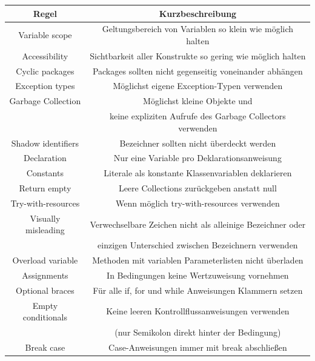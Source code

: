 \documentclass[da,ngerman]{stthesis}
\begin{document}
				\begin{center}
					\tabulinesep=1.5mm
					\begin{longtabu}{|c|c|}
						\hline
  						\textbf{Regel} & \textbf{Kurzbeschreibung}\\
  						\hline
  						Variable scope & Geltungsbereich von Variablen so klein wie möglich halten\\
						\hline
						Accessibility & Sichtbarkeit aller Konstrukte so gering wie möglich halten\\
						\hline
						Cyclic packages & Packages sollten nicht gegenseitig voneinander abhängen \\
						\hline
						Exception types & Möglichst eigene Exception-Typen verwenden \\
						\hline
						Garbage Collection & Möglichst kleine Objekte und \\ & keine expliziten Aufrufe des Garbage Collectors verwenden \\
						\hline
						Shadow identifiers & Bezeichner sollten nicht überdeckt werden \\
						\hline
						Declaration & Nur eine Variable pro Deklarationsanweisung \\
						\hline
						Constants & Literale als konstante Klassenvariablen deklarieren \\
						\hline
						Return empty & Leere Collections zurückgeben anstatt null \\
						\hline
						Try-with-resources & Wenn möglich try-with-resources verwenden \\
						\hline
						Visually misleading & Verwechselbare Zeichen nicht als alleinige Bezeichner oder \\ & einzigen Unterschied zwischen Bezeichnern verwenden \\
						\hline
						Overload variable & Methoden mit variablen Parameterlisten nicht überladen \\
						\hline
						Assignments & In Bedingungen keine Wertzuweisung vornehmen \\
						\hline
						Optional braces & Für alle if, for und while Anweisungen Klammern setzen \\
						\hline
						Empty conditionals & Keine leeren Kontrollflussanweisungen verwenden \\ & (nur Semikolon direkt hinter der Bedingung) \\
						\hline
						Break case & Case-Anweisungen immer mit break abschließen \\
						\hline

\end{longtabu}
\end{center}
\end{document}
